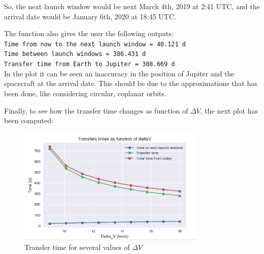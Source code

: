 \newpage
So, the next launch window would be next March 4th, 2019 at 2:41 UTC, and the
arrival date would be January 6th, 2020 at 18:45 UTC.

The function also gives the user the following outputs:\\
\texttt{Time from now to the next launch window = 40.121 d}\\
\texttt{Time between launch windows = 386.431 d}\\
\texttt{Transfer time from Earth to Jupiter = 308.669 d}\\

In the plot it can be seen an inaccuracy in the position of Jupiter and the spacecraft
at the arrival date. This should be due to the approximations that has been done,
like considering circular, coplanar orbits.

Finally, to see how the transfer time changes as function of $\Delta V$, the next
plot has been computed:

\begin{figure}[h]
	\centering
	\includegraphics[width=0.8\textwidth]{img/Transfer_times.png}
	\caption{Transfer time for several values of $\Delta V$}
	\label{fig:transfer_times}
\end{figure}

